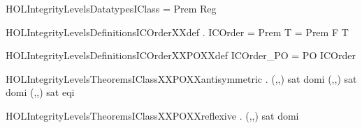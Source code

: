 \newcommand{\HOLIntegrityLevelsDate}{28 July 2013}
\newcommand{\HOLIntegrityLevelsTime}{16:26}
\begin{SaveVerbatim}{HOLIntegrityLevelsDatatypesIClass}
 = Prem \HOLTokenBar{} Reg
\end{SaveVerbatim}
\newcommand{\HOLIntegrityLevelsDatatypesIClass}{\UseVerbatim{HOLIntegrityLevelsDatatypesIClass}}
\newcommand{\HOLIntegrityLevelsDatatypes}{
\HOLIntegrityLevelsDatatypesIClass}
\begin{SaveVerbatim}{HOLIntegrityLevelsDefinitionsICOrderXXdef}
\HOLTokenTurnstile{} \HOLTokenForall{} .
     ICOrder   \HOLTokenEquiv{}
       = Prem  T    = Prem  F  T
\end{SaveVerbatim}
\newcommand{\HOLIntegrityLevelsDefinitionsICOrderXXdef}{\UseVerbatim{HOLIntegrityLevelsDefinitionsICOrderXXdef}}
\begin{SaveVerbatim}{HOLIntegrityLevelsDefinitionsICOrderXXPOXXdef}
\HOLTokenTurnstile{} ICOrder_PO = PO ICOrder
\end{SaveVerbatim}
\newcommand{\HOLIntegrityLevelsDefinitionsICOrderXXPOXXdef}{\UseVerbatim{HOLIntegrityLevelsDefinitionsICOrderXXPOXXdef}}
\newcommand{\HOLIntegrityLevelsDefinitions}{
\HOLDfnTag{IntegrityLevels}{ICOrder_def}\HOLIntegrityLevelsDefinitionsICOrderXXdef
\HOLDfnTag{IntegrityLevels}{ICOrder_PO_def}\HOLIntegrityLevelsDefinitionsICOrderXXPOXXdef
}
\begin{SaveVerbatim}{HOLIntegrityLevelsTheoremsIClassXXPOXXantisymmetric}
\HOLTokenTurnstile{} \HOLTokenForall{}    .
     (,,) sat  domi  \HOLTokenImp{}
     (,,) sat  domi  \HOLTokenImp{}
     (,,) sat  eqi 
\end{SaveVerbatim}
\newcommand{\HOLIntegrityLevelsTheoremsIClassXXPOXXantisymmetric}{\UseVerbatim{HOLIntegrityLevelsTheoremsIClassXXPOXXantisymmetric}}
\begin{SaveVerbatim}{HOLIntegrityLevelsTheoremsIClassXXPOXXreflexive}
\HOLTokenTurnstile{} \HOLTokenForall{}   . (,,) sat  domi 
\end{SaveVerbatim}

